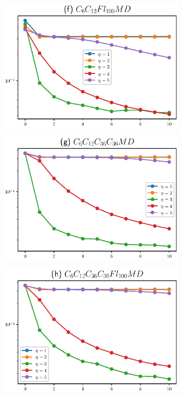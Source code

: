 \begin{figure}[!p]
\begin{center}
\begin{subfigure}{.5\textwidth}
			\centering
			\includegraphics[width=0.95\linewidth]{figuras/C5o6C5o12Rfl100MchD.eps}
		\end{subfigure}
		\newline
		\begin{subfigure}{.5\textwidth}
			\centering
			\includegraphics[width=0.95\linewidth]{figuras/C5o6C5o12C5o36C5o36RMchD.eps}
		\end{subfigure}\hfill%
		\begin{subfigure}{.5\textwidth}
			\centering
			\includegraphics[width=0.95\linewidth]{figuras/C5o6C5o12C5o36C5o36Rfl100MchD.eps}

\end{subfigure}
\end{center}
\end{figure}
